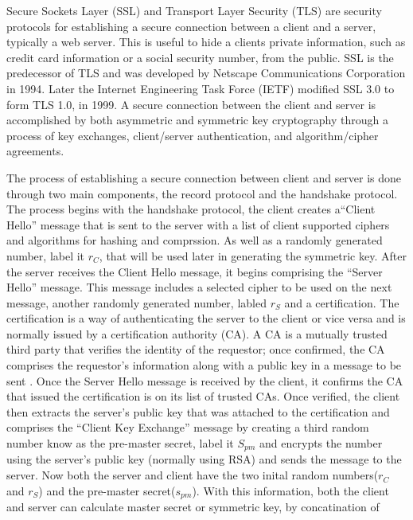 Secure Sockets Layer (SSL) and Transport Layer Security (TLS) are security
protocols for establishing a secure connection between a client and a server,
typically a web server.  This is useful to hide a clients private information,
such as credit card information or a social security number, from the public.
SSL is the predecessor of TLS and was developed by Netscape Communications
Corporation in 1994.  Later the Internet Engineering Task Force (IETF)
modified SSL 3.0 to form TLS 1.0, in 1999.  A secure connection between the
client and server is accomplished by both asymmetric and symmetric key
cryptography through a process of key exchanges, client/server authentication,
and algorithm/cipher agreements.

The process of establishing a secure connection between client and server is
done through two main components, the record protocol and the handshake protocol.  The process begins with the handshake protocol, the client creates a``Client Hello'' message that is sent to the server with a list of client supported ciphers and algorithms for hashing and comprssion.  As well as a randomly generated number, label it $r_{C}$, that will be used later in generating the symmetric key.  After the server receives the Client Hello message, it begins
comprising the ``Server Hello'' message.  This message includes a selected cipher to be used on the next message, another randomly generated number, labled $r_{S}$ and a
certification.  The certification is a way of authenticating the server to the
client or vice versa and is normally issued by a certification authority (CA).
A CA is a mutually trusted third party that verifies the identity of the
requestor; once confirmed, the CA comprises the requestor's information along
with a public key in a message to be sent \cite[p. 105]{oppliger}.  Once the Server
Hello message is received by the client, it confirms the CA that issued the
certification is on its list of trusted CAs.  Once verified, the client then
extracts the server's public key that was attached to the certification and comprises the
``Client Key Exchange'' message by creating a third random number know as the pre-master secret, label it $S_{pm}$  and encrypts
the number using the server's public key (normally using RSA) and sends the
message to the server.  Now both the server and client have the two inital random numbers($r_{C}$ and $r_{S}$) and the pre-master secret($s_{pm}$).  With this information, both the client and server can calculate master secret or symmetric key, by concatination of 

